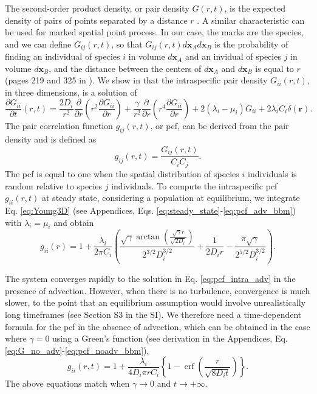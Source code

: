 \documentclass[english]{article}
\DeclareMathOperator\erf{erf}
\begin{document}
The second-order product density, or pair density $G(r,t)$, is the
expected density of pairs of points separated by a distance $r$ \citep{law_population_2003}.
A similar characteristic can be used for marked spatial point process.
In our case, the marks are the species, and we can define $G_{ij}(r,t)$,
so that $G_{ij}(r,t)d\mathbf{x}_{A}d\mathbf{x}_{B}$ is the probability
of finding an individual of species $i$ in volume $d\mathbf{x}_{A}$
and an invidual of species $j$ in volume $d\mathbf{x}_{B}$, and
the distance between the centers of $d\mathbf{x}_{A}$ and $d\mathbf{x}_{B}$
is equal to $r$ (pages 219 and 325 in \citealp{illian2008statistical}).
We show in \citet{picoche_rescience_2022} that the intraspecific
pair density $G_{ii}(r,t)$, in three dimensions, is a solution of
\begin{equation}
\frac{\partial G_{ii}}{\partial t}(r,t)=\frac{2D_{i}}{r^{2}}\frac{\partial}{\partial r}\left(r^{2}\frac{\partial G_{ii}}{\partial r}\right)+\frac{\gamma}{r^{2}}\frac{\partial}{\partial r}\left(r^{4}\frac{\partial G_{ii}}{\partial r}\right)+2(\lambda_{i}-\mu_{i})G_{ii}+2\lambda_i C_{i}\delta(\boldsymbol{r}).\label{eq:Young3D}
\end{equation}
The pair correlation function $g_{ij}(r,t)$, or pcf, can be derived
from the pair density and is defined as
\begin{equation}
g_{ij}(r,t)=\frac{G_{ij}(r,t)}{C_{i}C_{j}}.\label{eq:def_pcf}
\end{equation}
The pcf is equal to one when the spatial distribution of species $i$
individuals is random relative to species $j$ individuals. To compute
the intraspecific pcf $g_{ii}(r,t)$ at steady state, considering
a population at equilibrium, we integrate Eq. \ref{eq:Young3D} (see
Appendices, Eqs. \ref{eq:steady_state}-\ref{eq:pcf_adv_bbm}) with
$\lambda_{i}=\mu_{i}$ and obtain
\begin{equation}
g_{ii}(r)=1+\frac{\lambda_i}{2\pi C_{i}}\left(\frac{\sqrt{\gamma}\arctan\left(\frac{\sqrt{\gamma}r}{\sqrt{2D_i}}\right)}{2^{3/2}D_i^{3/2}}+\frac{1}{2D_ir}-\frac{\pi\sqrt{\gamma}}{2^{5/2}D_i^{3/2}}\right).\label{eq:pcf_intra_adv}
\end{equation}

The system converges rapidly to the solution in Eq. \ref{eq:pcf_intra_adv}
in the presence of advection. However, when there is no turbulence,
convergence is much slower, to the point that an equilibrium assumption
would involve unrealistically long timeframes (see Section S3 in the
SI). We therefore need a time-dependent formula for the pcf in the
absence of advection, which can be obtained in the case where $\gamma=0$
using a Green's function (see derivation in the Appendices, Eq. \ref{eq:G_no_adv}-\ref{eq:pcf_noadv_bbm}),
\begin{equation}
g_{ii}(r,t)=1+\frac{\lambda_i}{4D_i\pi rC_{i}}\left\{ 1-\erf\left(\frac{r}{\sqrt{8D_it}}\right)\right\}.\label{eq:pcf_intra_noadv}
\end{equation}
The above equations match when $\gamma\rightarrow0$ and $t\rightarrow+\infty$.
\end{document}

